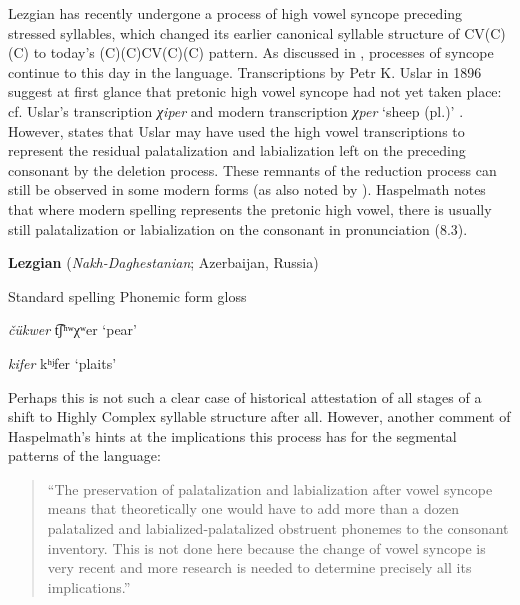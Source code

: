   Lezgian has recently undergone a process of high vowel syncope preceding stressed syllables, which changed its earlier canonical syllable structure of CV(C)(C) to today’s (C)(C)CV(C)(C) pattern. As discussed in , processes of syncope continue to this day in the language. Transcriptions by Petr K. Uslar in 1896 suggest at first glance that pretonic high vowel syncope had not yet taken place: cf. Uslar’s transcription \textit{χiper} and modern transcription \textit{χper} ‘sheep (pl.)’ \citep[36]{Haspelmath1993}. However, \citet[56]{Haspelmath1993} states that Uslar may have used the high vowel transcriptions to represent the residual palatalization and labialization left on the preceding consonant by the deletion process. These remnants of the reduction process can still be observed in some modern forms (as also noted by \citealt{ChitoranBabaliyeva2007}). Haspelmath notes that where modern spelling represents the pretonic high vowel, there is usually still palatalization or labialization on the consonant in pronunciation (8.3).



\ea\label{ex:(8.3)}
  \textbf{Lezgian} (\textit{Nakh-Daghestanian}; Azerbaijan, Russia)



Standard spelling  Phonemic form  gloss



\textit{čükwer}      t͡ʃʰʷχʷer    ‘pear’



\textit{kifer}      kʰʲfer       ‘plaits’



\citep[37]{Haspelmath1993}

\z


Perhaps this is not such a clear case of historical attestation of all stages of a shift to Highly Complex syllable structure after all. However, another comment of Haspelmath’s hints at the implications this process has for the segmental patterns of the language:


\begin{quote}
“The preservation of palatalization and labialization after vowel syncope means that theoretically one would have to add more than a dozen palatalized and labialized-palatalized obstruent phonemes to the consonant inventory. This is not done here because the change of vowel syncope is very recent and more research is needed to determine precisely all its implications.”



\citep[38]{Haspelmath1993}
\end{quote}



